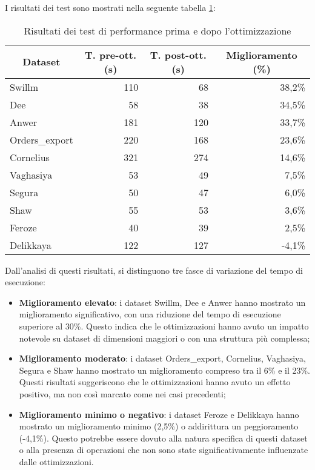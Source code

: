 I risultati dei test sono mostrati nella seguente tabella \ref{tab:performance-tests}:

\begin{table}[h]
    \centering
    \begin{tabular}{|l|r|r|r|}
        \hline
        \multicolumn{1}{|c|}{\textbf{Dataset}} & \multicolumn{1}{|c|}{\textbf{T. pre-ott. (s)}} & \multicolumn{1}{|c|}{\textbf{T. post-ott. (s)}} & \multicolumn{1}{|c|}{\textbf{Miglioramento (\%)}} \\
        \hline
        Swillm & 110 & 68 & 38,2\% \\
        Dee & 58 & 38 & 34,5\% \\
        Anwer & 181 & 120 & 33,7\% \\
        Orders\_export & 220 & 168 & 23,6\% \\
        Cornelius & 321 & 274 & 14,6\% \\
        Vaghasiya & 53 & 49 & 7,5\% \\
        Segura & 50 & 47 & 6,0\% \\
        Shaw & 55 & 53 & 3,6\% \\
        Feroze & 40 & 39 & 2,5\% \\
        Delikkaya & 122 & 127 & -4,1\% \\
        \hline
    \end{tabular}
    \caption{Risultati dei test di performance prima e dopo l'ottimizzazione}
    \label{tab:performance-tests}
\end{table}

Dall'analisi di questi risultati, si distinguono tre fasce di variazione del tempo di esecuzione:
\begin{itemize}
    \item \textbf{Miglioramento elevato}: i dataset Swillm, Dee e Anwer hanno mostrato un miglioramento significativo, con una riduzione del tempo di esecuzione superiore al 30\%. Questo indica che le ottimizzazioni hanno avuto un impatto notevole su dataset di dimensioni maggiori o con una struttura più complessa;
    \item \textbf{Miglioramento moderato}: i dataset Orders\_export, Cornelius, Vaghasiya, Segura e Shaw hanno mostrato un miglioramento compreso tra il 6\% e il 23\%. Questi risultati suggeriscono che le ottimizzazioni hanno avuto un effetto positivo, ma non così marcato come nei casi precedenti;
    \item \textbf{Miglioramento minimo o negativo}: i dataset Feroze e Delikkaya hanno mostrato un miglioramento minimo (2,5\%) o addirittura un peggioramento (-4,1\%). Questo potrebbe essere dovuto alla natura specifica di questi dataset o alla presenza di operazioni che non sono state significativamente influenzate dalle ottimizzazioni.
\end{itemize}

